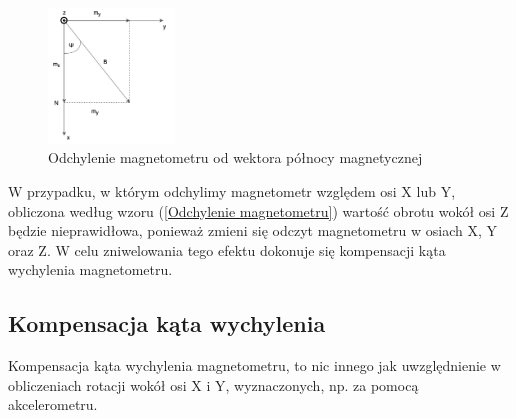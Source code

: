 \begin{figure}[h!]
    \centering
    \includegraphics[width=0.3\textwidth]{Rysunki/Rozdzial03/Magnetometr_odchylenie.png}
    \caption{Odchylenie magnetometru od wektora północy magnetycznej}
    \label{Rotacja magnetometru}
\end{figure}

W przypadku, w którym odchylimy magnetometr względem osi X lub Y, obliczona według wzoru (\ref{Odchylenie magnetometru}) wartość obrotu wokół osi Z będzie nieprawidłowa, ponieważ zmieni się odczyt magnetometru w osiach X, Y oraz Z. W celu zniwelowania tego efektu dokonuje się kompensacji kąta wychylenia magnetometru.

\subsection{Kompensacja kąta wychylenia}
Kompensacja kąta wychylenia magnetometru, to nic innego jak uwzględnienie w obliczeniach rotacji wokół osi X i Y, wyznaczonych, np. za pomocą akcelerometru.

